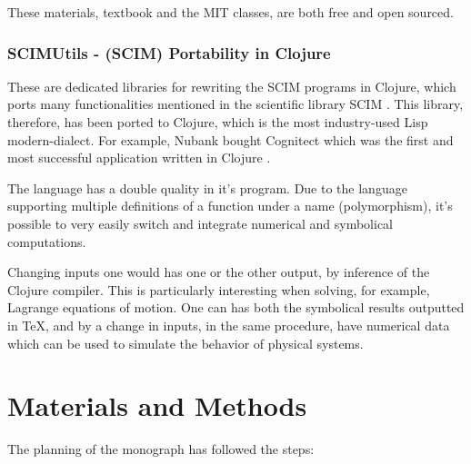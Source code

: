\documentclass[
12pt,				%
openright,			%
oneside,			%
a4paper,			%
brazil,				%
english,			%
]{abntex2}
\begin{document}
These materials, textbook and the MIT classes, are both free and open
sourced.
\subsection{SCIMUtils - (SCIM) Portability in Clojure}
\label{sec:scimutils}

These are dedicated libraries for rewriting the SCIM programs in
Clojure, which ports many functionalities mentioned in the scientific
library SCIM \cite{sicmutils2016github}. This library, therefore, has
been ported to Clojure, which is the most industry-used Lisp
modern-dialect. For example, Nubank bought Cognitect which was the
first and most successful application written in Clojure \cite{clojure2020}. 

The language has a double quality in it's program. Due to the language
supporting multiple definitions of a function under a name
(polymorphism), it's possible to very easily switch and integrate
numerical and symbolical computations.

Changing inputs one would has one or the other output, by inference
of the Clojure compiler. This is particularly interesting when
solving, for example, Lagrange equations of motion. One can has both
the symbolical results outputted in \TeX{}, and by a change in inputs,
in the same procedure, have numerical data which can be used to
simulate the behavior of physical systems. 


\chapter{Materials and Methods}
The planning of the monograph has followed the steps:
\end{document}
